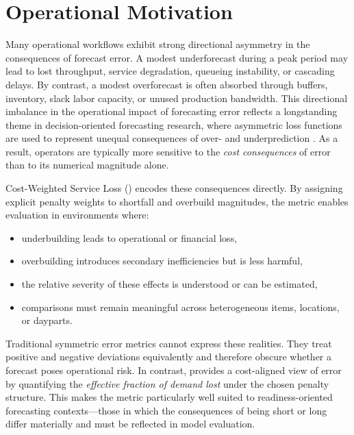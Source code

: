 \section{Operational Motivation}

Many operational workflows exhibit strong directional asymmetry in the
consequences of forecast error. A modest underforecast during a peak period may
lead to lost throughput, service degradation, queueing instability, or cascading
delays. By contrast, a modest overforecast is often absorbed through buffers,
inventory, slack labor capacity, or unused production bandwidth. This directional
imbalance in the operational impact of forecasting error reflects a longstanding
theme in decision-oriented forecasting research, where asymmetric loss functions
are used to represent unequal consequences of over- and underprediction
\citep{zellner1986}. As a result, operators are typically more sensitive to the
\emph{cost consequences} of error than to its numerical magnitude alone.

Cost-Weighted Service Loss (\CWSL) encodes these consequences directly. By
assigning explicit penalty weights to shortfall and overbuild magnitudes, the
metric enables evaluation in environments where:

\begin{itemize}
    \item underbuilding leads to operational or financial loss,
    \item overbuilding introduces secondary inefficiencies but is less harmful,
    \item the relative severity of these effects is understood or can be estimated,
    \item comparisons must remain meaningful across heterogeneous items, locations,
          or dayparts.
\end{itemize}

Traditional symmetric error metrics cannot express these realities. They treat
positive and negative deviations equivalently and therefore obscure whether a
forecast poses operational risk. In contrast, \CWSL{} provides a cost-aligned
view of error by quantifying the \emph{effective fraction of demand lost} under
the chosen penalty structure. This makes the metric particularly well suited to
readiness-oriented forecasting contexts—those in which the consequences of being
short or long differ materially and must be reflected in model evaluation.
